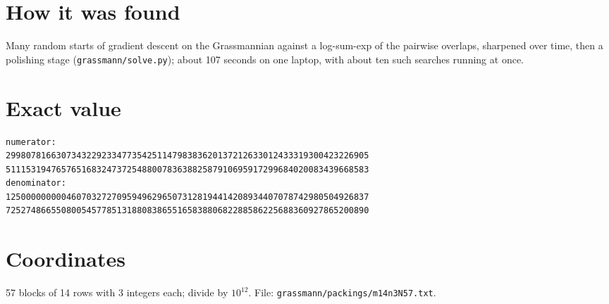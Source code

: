 \documentclass[11pt,a4paper]{article}
\begin{document}
\section{How it was found}
Many random starts of gradient descent on the Grassmannian against a log-sum-exp of the pairwise overlaps, sharpened over time, then a polishing stage (\texttt{grassmann/solve.py}); about 107 seconds on one laptop, with about ten such searches running at once.


\appendix
\section{Exact value}
{\small
\begin{verbatim}
numerator:
299807816630734322923347735425114798383620137212633012433319300423226905
511153194765765168324737254880078363882587910695917299684020083439668583
denominator:
125000000000460703272709594962965073128194414208934407078742980504926837
725274866550800545778513188083865516583880682288586225688360927865200890
\end{verbatim}}

\section{Coordinates}
57 blocks of 14 rows with 3 integers each; divide by $10^{12}$. File: \texttt{grassmann/packings/m14n3N57.txt}.
{\tiny
\begin{multicols}{3}
\end{multicols}}
\end{document}
